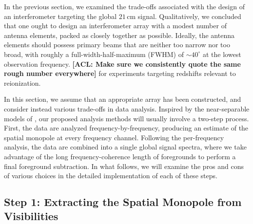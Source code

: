 \documentclass[twocolumn,apj,numberedappendix]{emulateapj}
\newcommand{\acl}[1]{{\color{red} \textbf{[ACL:  #1]}}}
\begin{document}
In the previous section, we examined the trade-offs associated with the design of an interferometer targeting the global $21\,\textrm{cm}$ signal. Qualitatively, we concluded that one ought to design an interferometer array with a modest number of antenna elements, packed as closely together as possible. Ideally, the antenna elements should possess primary beams that are neither too narrow nor too broad, with roughly a full-width-half-maximum (FWHM) of $\sim 40^\circ$ at the lowest observation frequency. \acl{Make sure we consistently quote the same rough number everywhere} for experiments targeting redshifts relevant to reionization.

In this section, we assume that an appropriate array has been constructed, and consider instead various trade-offs in data analysis. Inspired by the near-separable models of \citet{Liu_Switzer_2014}, our proposed analysis methods will usually involve a two-step process. First, the data are analyzed frequency-by-frequency, producing an estimate of the spatial monopole at every frequency channel. Following the per-frequency analysis, the data are combined into a single global signal spectra, where we take advantage of the long frequency-coherence length of foregrounds to perform a final foreground subtraction. In what follows, we will examine the pros and cons of various choices in the detailed implementation of each of these steps.

\subsection{Step 1: Extracting the Spatial Monopole from Visibilities}
\end{document}
